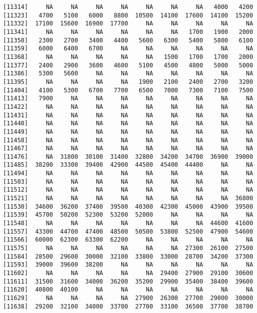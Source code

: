 \documentclass[]{article}
\begin{document}
\begin{verbatim}
[11314]     NA     NA     NA     NA     NA     NA     NA   4000   4200
[11323]   4700   5100   6000   8800  10500  14100  17600  14100  15200
[11332]  17100  15600  16900  17700     NA     NA     NA     NA     NA
[11341]     NA     NA     NA     NA     NA     NA   1700   1900   2000
[11350]   2300   2700   3400   4400   5600   6300   5400   5800   6100
[11359]   6000   6400   6700     NA     NA     NA     NA     NA     NA
[11368]     NA     NA     NA     NA     NA   1500   1700   1700   2000
[11377]   2400   2900   3600   4600   5100   4500   4800   5000   5000
[11386]   5300   5600     NA     NA     NA     NA     NA     NA     NA
[11395]     NA     NA     NA     NA   1900   2100   2400   2700   3200
[11404]   4100   5300   6700   7700   6500   7000   7300   7100   7500
[11413]   7900     NA     NA     NA     NA     NA     NA     NA     NA
[11422]     NA     NA     NA     NA     NA     NA     NA     NA     NA
[11431]     NA     NA     NA     NA     NA     NA     NA     NA     NA
[11440]     NA     NA     NA     NA     NA     NA     NA     NA     NA
[11449]     NA     NA     NA     NA     NA     NA     NA     NA     NA
[11458]     NA     NA     NA     NA     NA     NA     NA     NA     NA
[11467]     NA     NA     NA     NA     NA     NA     NA     NA     NA
[11476]     NA  31800  30100  31400  32800  34200  34700  36900  39000
[11485]  38200  33300  39400  42900  44500  45400  44400     NA     NA
[11494]     NA     NA     NA     NA     NA     NA     NA     NA     NA
[11503]     NA     NA     NA     NA     NA     NA     NA     NA     NA
[11512]     NA     NA     NA     NA     NA     NA     NA     NA     NA
[11521]     NA     NA     NA     NA     NA     NA     NA     NA  36800
[11530]  34600  36200  37400  39500  40300  42300  45000  43900  39500
[11539]  45700  50200  52300  53200  52000     NA     NA     NA     NA
[11548]     NA     NA     NA     NA     NA     NA     NA  44600  41600
[11557]  43300  44700  47400  48500  50500  53800  52500  47900  54600
[11566]  60000  62300  63300  62200     NA     NA     NA     NA     NA
[11575]     NA     NA     NA     NA     NA     NA  27300  26100  27500
[11584]  28500  29600  30000  32100  33800  33000  28700  34200  37300
[11593]  39000  39600  38200     NA     NA     NA     NA     NA     NA
[11602]     NA     NA     NA     NA     NA  29400  27900  29100  30600
[11611]  31500  31600  34000  36200  35200  29900  35400  38400  39600
[11620]  40800  40100     NA     NA     NA     NA     NA     NA     NA
[11629]     NA     NA     NA     NA  27900  26300  27700  29000  30000
[11638]  29200  32100  34000  33700  27700  33100  36500  37700  38700

\end{verbatim}
\end{document}
